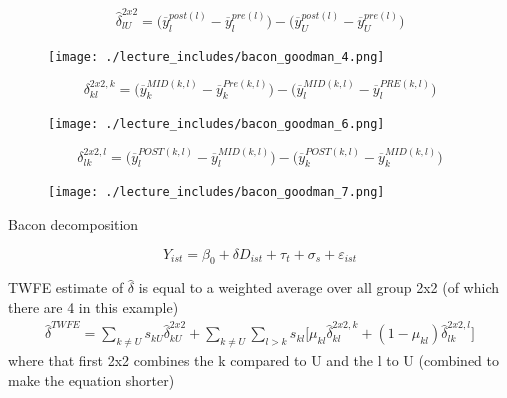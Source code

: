 \documentclass{beamer}
\begin{document}
\begin{frame}[plain]
$$\widehat{\delta}^{2x2}_{lU} = \bigg ( \overline{y}_l^{post(l)} - \overline{y}_l^{pre(l)} \bigg ) - \bigg ( \overline{y}_U^{post(l)} - \overline{y}_U^{pre(l)} \bigg ) $$
	\begin{figure}
	\texttt{[image: ./lecture\_includes/bacon\_goodman\_4.png]}
	\end{figure}

\end{frame}


\begin{frame}[plain]

$$\delta_{kl}^{2x2,k} = \bigg ( \overline{y}_k^{MID(k,l)} - \overline{y}_k^{Pre(k,l)} \bigg ) - \bigg ( \overline{y}_l^{MID(k,l)} - \overline{y}_l^{PRE(k,l)} \bigg ) $$

	\begin{figure}
	\texttt{[image: ./lecture\_includes/bacon\_goodman\_6.png]}
	\end{figure}

\end{frame}

\begin{frame}[plain]
$$\delta_{lk}^{2x2,l} = \bigg ( \overline{y}_l^{POST(k,l)} - \overline{y}_l^{MID(k,l)} \bigg ) - \bigg ( \overline{y}_k^{POST(k,l)} - \overline{y}_k^{MID(k,l)} \bigg ) $$

	\begin{figure}
	\texttt{[image: ./lecture\_includes/bacon\_goodman\_7.png]}
	\end{figure}

\end{frame}


	

\begin{frame}{Bacon decomposition}

$$Y_{ist} = \beta_0 + \delta D_{ist} + \tau_t + \sigma_s + \varepsilon_{ist}$$


TWFE estimate of $\widehat{\delta}$ is equal to a weighted average over all group 2x2 (of which there are 4 in this example)
\begin{eqnarray*}	
\widehat{\delta}^{TWFE} = \sum_{k \neq U} s_{kU}\widehat{\delta}_{kU}^{2x2} + \sum_{k \neq U} \sum_{l>k} s_{kl}  \bigg [ \mu_{kl}\widehat{\delta}_{kl}^{2x2,k} + (1-\mu_{kl}) \widehat{\delta}_{lk}^{2x2,l} \bigg]
\end{eqnarray*}where that first 2x2 combines the k compared to U and the l to U (combined to make the equation shorter)

\end{frame}
	
\end{document}
